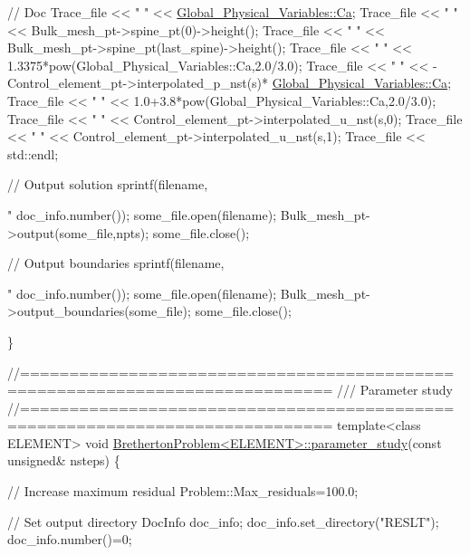\begin{DoxyCodeInclude}
 \textcolor{comment}{// Doc}
 Trace\_file << \textcolor{stringliteral}{" "} << \hyperlink{namespaceGlobal__Physical__Variables_a8b32b93d2e546f9375ec418474107838}{Global\_Physical\_Variables::Ca};
 Trace\_file << \textcolor{stringliteral}{" "} << Bulk\_mesh\_pt->spine\_pt(0)->height();
 Trace\_file << \textcolor{stringliteral}{" "} << Bulk\_mesh\_pt->spine\_pt(last\_spine)->height();
 Trace\_file << \textcolor{stringliteral}{" "} << 1.3375*pow(Global\_Physical\_Variables::Ca,2.0/3.0);
 Trace\_file << \textcolor{stringliteral}{" "} << -Control\_element\_pt->interpolated\_p\_nst(s)*
                      \hyperlink{namespaceGlobal__Physical__Variables_a8b32b93d2e546f9375ec418474107838}{Global\_Physical\_Variables::Ca};
 Trace\_file << \textcolor{stringliteral}{" "} << 1.0+3.8*pow(Global\_Physical\_Variables::Ca,2.0/3.0);
 Trace\_file << \textcolor{stringliteral}{" "} << Control\_element\_pt->interpolated\_u\_nst(s,0);
 Trace\_file << \textcolor{stringliteral}{" "} << Control\_element\_pt->interpolated\_u\_nst(s,1);
 Trace\_file << std::endl;


 \textcolor{comment}{// Output solution }
 sprintf(filename,\textcolor{stringliteral}{"%
         doc\_info.number());
 some\_file.open(filename);
 Bulk\_mesh\_pt->output(some\_file,npts);
 some\_file.close();


 \textcolor{comment}{// Output boundaries}
 sprintf(filename,\textcolor{stringliteral}{"%
         doc\_info.number());
 some\_file.open(filename);
 Bulk\_mesh\_pt->output\_boundaries(some\_file);
 some\_file.close();

\}




\textcolor{comment}{//=============================================================================}\textcolor{comment}{}
\textcolor{comment}{/// Parameter study}
\textcolor{comment}{}\textcolor{comment}{//=============================================================================}
\textcolor{keyword}{template}<\textcolor{keyword}{class} ELEMENT>
\textcolor{keywordtype}{void} \hyperlink{classBrethertonProblem_ac24db9373e1a3005e6b14fc92c16b41c}{BrethertonProblem<ELEMENT>::parameter\_study}(\textcolor{keyword}{const} \textcolor{keywordtype}{unsigned}&
       nsteps)
\{

 \textcolor{comment}{// Increase maximum residual}
 Problem::Max\_residuals=100.0;

 \textcolor{comment}{// Set output directory}
 DocInfo doc\_info;
 doc\_info.set\_directory(\textcolor{stringliteral}{"RESLT"});
 doc\_info.number()=0;


}}
\end{DoxyCodeInclude}
